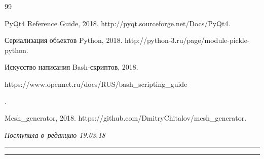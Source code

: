{{\begin{thebibliography}{99}


  PyQt4 Reference Guide, 2018. {\sf http://pyqt.sourceforge.net/Docs/PyQt4}.




  Сериализация объектов Python, 2018. {\sf http://python-3.ru/page/module-pickle-python}.




  Искусство написания Bash-скриптов, 2018. {\sf 


https://www.opennet.ru/docs/RUS/\linebreak bash\_scripting\_guide}.




  Mesh\_generator, 2018. {\sf https://github.com/DmitryChitalov/mesh\_generator}.


          \end{thebibliography}


} }








\vspace*{-3pt}





\hfill{\small\textit{Поступила в~редакцию 19.03.18}}














\vspace*{8pt}





\hrule





\vspace*{2pt}















\hrule





